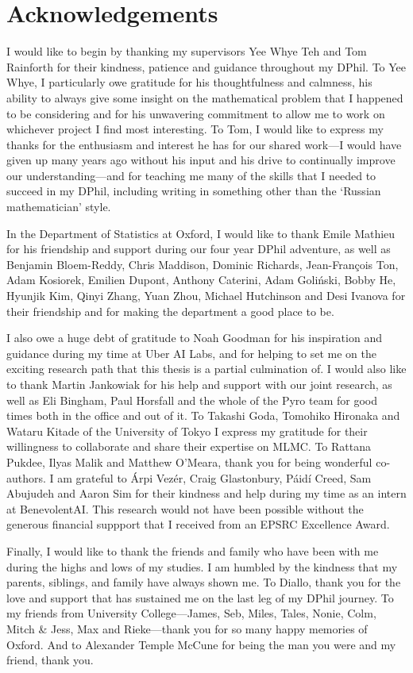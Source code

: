 \documentclass[a4paper, 10pt]{report}
\theoremstyle{plain}
\theoremstyle{definition}
\theoremstyle{remark}
\begin{document}
	
	\newpage
	\chapter*{Acknowledgements}
	I would like to begin by thanking my supervisors Yee Whye Teh and Tom Rainforth for their kindness, patience and guidance throughout my DPhil.
	To Yee Whye, I particularly owe gratitude for his thoughtfulness and calmness, his ability to always give some insight on the mathematical problem that I happened to be considering and for his unwavering commitment to allow me to work on whichever project I find most interesting.
	To Tom, I would like to express my thanks for the enthusiasm and interest he has for our shared work---I would have given up many years ago without his input and his drive to continually improve our understanding---and for teaching me many of the skills that I needed to succeed in my DPhil, including writing in something other than the `Russian mathematician' style.
	
	In the Department of Statistics at Oxford, I would like to thank Emile Mathieu for his friendship and support during our four year DPhil adventure, as well as Benjamin Bloem-Reddy, Chris Maddison, Dominic Richards, Jean-François Ton, Adam Kosiorek, Emilien Dupont, Anthony Caterini, Adam Goliński, Bobby He, Hyunjik Kim, Qinyi Zhang, Yuan Zhou, Michael Hutchinson and Desi Ivanova for their friendship and for making the department a good place to be.
	
	I also owe a huge debt of gratitude to Noah Goodman for his inspiration and guidance during my time at Uber AI Labs, and for helping to set me on the exciting research path that this thesis is a partial culmination of.
	I would also like to thank Martin Jankowiak for his help and support with our joint research, as well as Eli Bingham, Paul Horsfall and the whole of the Pyro team for good times both in the office and out of it.
	To Takashi Goda, Tomohiko Hironaka and Wataru Kitade of the University of Tokyo I express my gratitude for their willingness to collaborate and share their expertise on MLMC.
	To Rattana Pukdee, Ilyas Malik and Matthew O'Meara, thank you for being wonderful co-authors.
	I am grateful to Árpi Vezér, Craig Glastonbury, Páidí Creed, Sam Abujudeh and Aaron Sim for their kindness and help during my time as an intern at BenevolentAI.
	This research would not have been possible without the generous financial suppport that I received from an EPSRC Excellence Award.
	
	Finally, I would like to thank the friends and family who have been with me during the highs and lows of my studies.
	I am humbled by the kindness that my parents, siblings, and family have always shown me.
	To Diallo, thank you for the love and support that has sustained me on the last leg of my DPhil journey.
	To my friends from University College---James, Seb, Miles, Tales, Nonie, Colm, Mitch \& Jess, Max and Rieke---thank you for so many happy memories of Oxford.
	And to Alexander Temple McCune for being the man you were and my friend, thank you.
	
\end{document}
